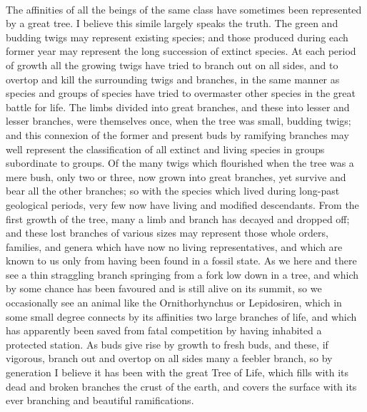 \documentclass{article}
\begin{document}
\\
The affinities of all the beings of the same class have sometimes been represented by a great tree. I believe this simile largely speaks the truth. The green and budding twigs may represent existing species; and those produced during each former year may represent the long succession of extinct species. At each period of growth all the growing twigs have tried to branch out on all sides, and to overtop and kill the surrounding twigs and branches, in the same manner as species and groups of species have tried to overmaster other species in the great battle for life. The limbs divided into great branches, and these into lesser and lesser branches, were themselves once, when the tree was small, budding twigs; and this connexion of the former and present buds by ramifying branches may well represent the classification of all extinct and living species in groups subordinate to groups. Of the many twigs which flourished when the tree was a mere bush, only two or three, now grown into great branches, yet survive and bear all the other branches; so with the species which lived during long-past geological periods, very few now have living and modified descendants. From the first growth of the tree, many a limb and branch has decayed and dropped off; and these lost branches of various sizes may represent those whole orders, families, and genera which have now no living representatives, and which are known to us only from having been found in a fossil state. As we here and there see a thin straggling branch springing from a fork low down in a tree, and which by some chance has been favoured and is still alive on its summit, so we occasionally see an animal like the Ornithorhynchus or Lepidosiren, which in some small degree connects by its affinities two large branches of life, and which has apparently been saved from fatal competition by having inhabited a protected station. As buds give rise by growth to fresh buds, and these, if vigorous, branch out and overtop on all sides many a feebler branch, so by generation I believe it has been with the great Tree of Life, which fills with its dead and broken branches the crust of the earth, and covers the surface with its ever branching and beautiful ramifications.\\
\end{document}
